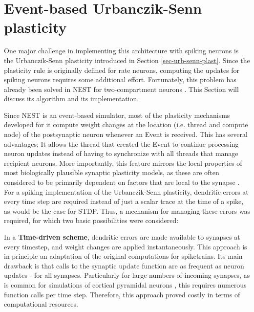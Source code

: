 \section{Event-based Urbanczik-Senn plasticity}\label{sec-event-urb}

One major challenge in implementing this architecture with spiking neurons is the Urbanczik-Senn plasticity introduced
in Section \ref{sec-urb-senn-plast}. Since the plasticity rule is originally defined for rate neurons, computing the
updates for spiking neurons requires some additional effort. Fortunately, this problem has already been solved in NEST
for two-compartment neurons \citep{Stapmanns2021}. This Section will discuss its algorithm and its implementation.
\newline

Since NEST is an event-based simulator, most of the plasticity mechanisms developed for it compute weight changes at the
location (i.e. thread and compute node) of the postsynaptic neuron whenever an Event is received. This has several
advantages; It allows the thread that created the Event to continue processing neuron updates instead of having to
synchronize with all threads that manage recipient neurons.  More importantly, this feature mirrors the local properties
of most biologically plausible synaptic plasticity models, as these are often considered to be primarily dependent on
factors that are local to the synapse \citep{magee2020synaptic}. For a spiking implementation of the Urbanczik-Senn
plasticity, dendritic errors at every time step are required instead of just a scalar trace at the time of a spike, as
would be the case for STDP. Thus, a mechanism for managing these errors was required, for which two basic possibilities
were considered:

In a \textbf{Time-driven scheme}, dendritic errors are made available to synapses at every timestep, and weight changes
are applied instantaneously. This approach is in principle an adaptation of the original computations for spiketrains.
Its main drawback is that calls to the synaptic update function are as frequent as neuron updates - for all synapses.
Particularly for large numbers of incoming synapses, as is common for simulations of cortical pyramidal neurons
\citep{potjans2014cell,vezoli2004quantitative}, this requires numerous function calls per time step.  Therefore,
this approach proved costly in terms of computational resources.

